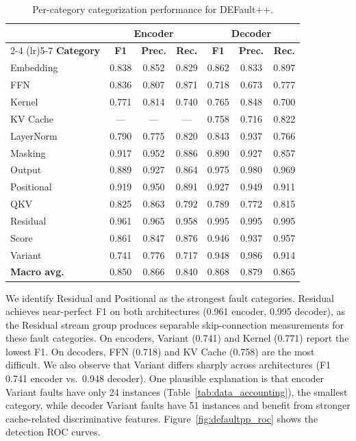 \begin{table}[!htbp]
\centering
\caption{Per-category categorization performance for DEFault++.}
\label{tab:rq1_perclass}
\small
\begin{tabular}{l c c c c c c}
\toprule
& \multicolumn{3}{c}{\textbf{Encoder}} & \multicolumn{3}{c}{\textbf{Decoder}} \\
\cmidrule(lr){2-4} \cmidrule(lr){5-7}
\textbf{Category} & \textbf{F1} & \textbf{Prec.} & \textbf{Rec.} & \textbf{F1} & \textbf{Prec.} & \textbf{Rec.} \\
\midrule
Embedding & 0.838 & 0.852 & 0.829 & 0.862 & 0.833 & 0.897 \\
FFN & 0.836 & 0.807 & 0.871 & 0.718 & 0.673 & 0.777 \\
Kernel & 0.771 & 0.814 & 0.740 & 0.765 & 0.848 & 0.700 \\
KV Cache & --- & --- & --- & 0.758 & 0.716 & 0.822 \\
LayerNorm & 0.790 & 0.775 & 0.820 & 0.843 & 0.937 & 0.766 \\
Masking & 0.917 & 0.952 & 0.886 & 0.890 & 0.927 & 0.857 \\
Output & 0.889 & 0.927 & 0.864 & 0.975 & 0.980 & 0.969 \\
Positional & 0.919 & 0.950 & 0.891 & 0.927 & 0.949 & 0.911 \\
QKV & 0.825 & 0.863 & 0.792 & 0.789 & 0.772 & 0.815 \\
Residual & 0.961 & 0.965 & 0.958 & 0.995 & 0.995 & 0.995 \\
Score & 0.861 & 0.847 & 0.876 & 0.946 & 0.937 & 0.957 \\
Variant & 0.741 & 0.776 & 0.717 & 0.948 & 0.986 & 0.914 \\
\midrule
\textbf{Macro avg.} & 0.850 & 0.866 & 0.840 & 0.868 & 0.879 & 0.865 \\
\bottomrule
\end{tabular}
\end{table}

We identify Residual and Positional as the strongest fault categories. Residual achieves near-perfect F1 on both architectures (0.961 encoder, 0.995 decoder), as the Residual stream group produces separable skip-connection measurements for these fault categories. On encoders, Variant (0.741) and Kernel (0.771) report the lowest F1. On decoders, FFN (0.718) and KV Cache (0.758) are the most difficult. We also observe that Variant differs sharply across architectures (F1 0.741 encoder vs.\ 0.948 decoder). One plausible explanation is that encoder Variant faults have only 24 instances (Table~\ref{tab:data_accounting}), the smallest category, while decoder Variant faults have 51 instances and benefit from stronger cache-related discriminative features. Figure~\ref{fig:defaultpp_roc} shows the detection ROC curves.

